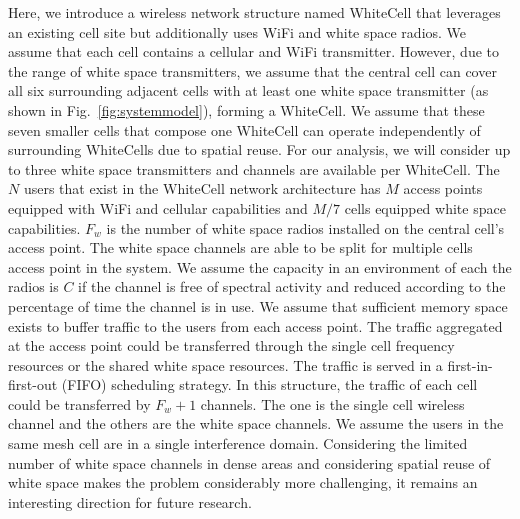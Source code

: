 Here, we introduce a wireless network structure named WhiteCell that leverages an existing
cell site but additionally uses WiFi and white space radios. We assume that each cell contains 
a cellular and WiFi transmitter. However, due to the range of white space transmitters, we 
assume that the central cell can cover all six surrounding adjacent cells with at least
one white space transmitter (as shown in Fig.~\ref{fig:systemmodel}), forming a WhiteCell. 
We assume that these seven smaller cells that compose one WhiteCell can operate independently
of surrounding WhiteCells due to spatial reuse. For our analysis, we will consider up to 
three white space transmitters and channels are available per WhiteCell.
The $N$ users that exist in the WhiteCell network architecture has $M$ access points 
equipped with WiFi and cellular capabilities and $M/7$ cells equipped white space capabilities. 
$F_w$ is the number of white space radios installed on the central cell's access point.
The white space channels are able to be split for multiple cells access point in the system.
We assume the capacity in an environment of each the radios is $C$ if the channel is free
of spectral activity and reduced according to the percentage of time the channel is in use. 
We assume that sufficient memory space exists to buffer traffic to the users from each access point.
The traffic aggregated at the access point could be transferred through the single cell 
frequency resources or the shared white space resources.
The traffic is served in a first-in-first-out (FIFO) scheduling strategy.
In this structure, the traffic of each cell could be transferred by $F_w+1$ channels.
The one is the single cell wireless channel and the others are the white space channels.
We assume the users in the same mesh cell are in a single interference domain. 
Considering the limited number of white space channels in dense areas and considering spatial reuse 
of white space makes the problem considerably more challenging, it remains an interesting 
direction for future research. 

